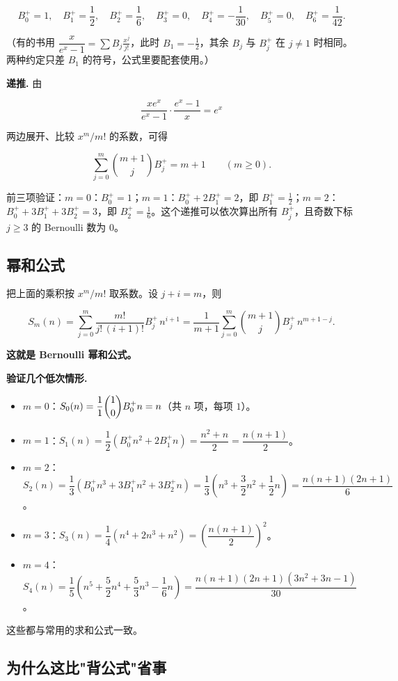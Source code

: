 \[
B_0^+=1,\quad B_1^+=\frac12,\quad B_2^+=\frac16,\quad B_3^+=0,\quad B_4^+=-\frac1{30},\quad B_5^+=0,\quad B_6^+=\frac1{42}.
\]

（有的书用 $\dfrac{x}{e^x-1}=\sum B_j\frac{x^j}{j!}$，此时 $B_1=-\frac12$，其余 $B_j$ 与 $B_j^+$ 在 $j\ne1$ 时相同。两种约定只差 $B_1$ 的符号，公式里要配套使用。）

\textbf{递推.} 由

\[
\frac{xe^x}{e^x-1}\cdot\frac{e^x-1}{x}=e^x
\]

两边展开、比较 $x^m/m!$ 的系数，可得

\[
\sum_{j=0}^{m}\binom{m+1}{j}B_j^+=m+1\qquad(m\ge0).
\]

前三项验证：$m=0$：$B_0^+=1$；$m=1$：$B_0^++2B_1^+=2$，即 $B_1^+=\frac12$；$m=2$：$B_0^++3B_1^++3B_2^+=3$，即 $B_2^+=\frac16$。这个递推可以依次算出所有 $B_j^+$，且奇数下标 $j\ge3$ 的 Bernoulli 数为 $0$。

\subsection{幂和公式}


把上面的乘积按 $x^m/m!$ 取系数。设 $j+i=m$，则

\[
S_m(n)=\sum_{j=0}^{m}\frac{m!}{j!\,(i+1)!}B_j^+\,n^{i+1}
=\frac{1}{m+1}\sum_{j=0}^{m}\binom{m+1}{j}B_j^+\,n^{m+1-j}.
\]

\textbf{这就是 Bernoulli 幂和公式。}

\textbf{验证几个低次情形.}

\begin{itemize}
\item $m=0$：$S_0(n)=\dfrac{1}{1}\dbinom10B_0^+n=n$（共 $n$ 项，每项 $1$）。
\item $m=1$：$S_1(n)=\dfrac12\left(B_0^+n^2+2B_1^+n\right)=\dfrac{n^2+n}{2}=\dfrac{n(n+1)}2$。
\item $m=2$：$S_2(n)=\dfrac13\left(B_0^+n^3+3B_1^+n^2+3B_2^+n\right)=\dfrac13\left(n^3+\dfrac32n^2+\dfrac12n\right)=\dfrac{n(n+1)(2n+1)}6$。
\item $m=3$：$S_3(n)=\dfrac14\left(n^4+2n^3+n^2\right)=\left(\dfrac{n(n+1)}2\right)^2$。
\item $m=4$：$S_4(n)=\dfrac15\left(n^5+\dfrac52n^4+\dfrac53n^3-\dfrac16n\right)=\dfrac{n(n+1)(2n+1)(3n^2+3n-1)}{30}$。
\end{itemize}


这些都与常用的求和公式一致。

\subsection{为什么这比"背公式"省事}


